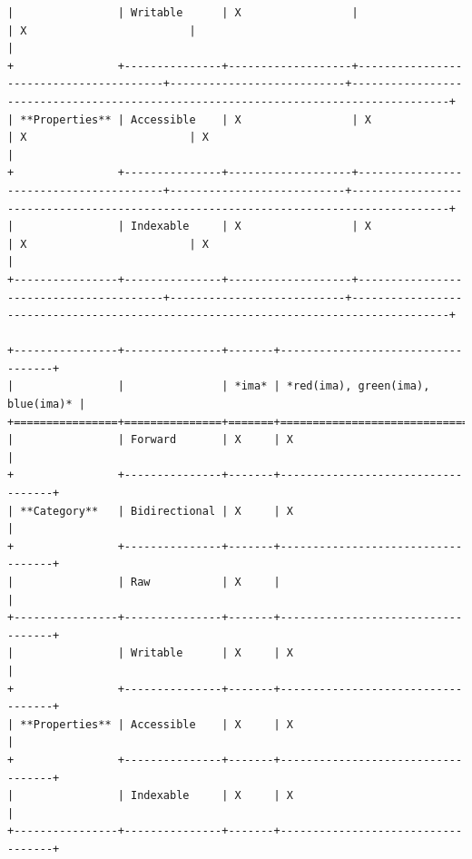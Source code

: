\begin{verbatim}
|                | Writable      | X                 |                                        | X                         |                                                                                     |
+                +---------------+-------------------+----------------------------------------+---------------------------+-------------------------------------------------------------------------------------+
| **Properties** | Accessible    | X                 | X                                      | X                         | X                                                                                   |
+                +---------------+-------------------+----------------------------------------+---------------------------+-------------------------------------------------------------------------------------+
|                | Indexable     | X                 | X                                      | X                         | X                                                                                   |
+----------------+---------------+-------------------+----------------------------------------+---------------------------+-------------------------------------------------------------------------------------+

+----------------+---------------+-------+-----------------------------------+
|                |               | *ima* | *red(ima), green(ima), blue(ima)* |
+================+===============+=======+===================================+
|                | Forward       | X     | X                                 |
+                +---------------+-------+-----------------------------------+
| **Category**   | Bidirectional | X     | X                                 |
+                +---------------+-------+-----------------------------------+
|                | Raw           | X     |                                   |
+----------------+---------------+-------+-----------------------------------+
|                | Writable      | X     | X                                 |
+                +---------------+-------+-----------------------------------+
| **Properties** | Accessible    | X     | X                                 |
+                +---------------+-------+-----------------------------------+
|                | Indexable     | X     | X                                 |
+----------------+---------------+-------+-----------------------------------+

\end{verbatim}


